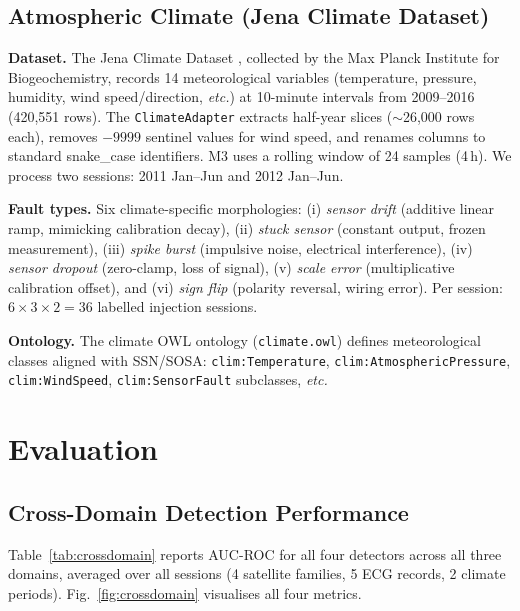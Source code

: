 \documentclass[conference]{IEEEtran}
\begin{document}
\subsection{Atmospheric Climate (Jena Climate Dataset)}

\textbf{Dataset.} The Jena Climate Dataset \cite{jena_climate}, collected by the
Max Planck Institute for Biogeochemistry, records 14 meteorological variables
(temperature, pressure, humidity, wind speed/direction, \emph{etc.}) at 10-minute
intervals from 2009--2016 (420,551 rows). The \texttt{ClimateAdapter} extracts
half-year slices ($\sim$26,000 rows each), removes $-9999$ sentinel values for
wind speed, and renames columns to standard snake\_case identifiers. M3 uses a
rolling window of 24 samples (4\,h). We process two sessions: 2011 Jan--Jun and
2012 Jan--Jun.

\textbf{Fault types.} Six climate-specific morphologies: (i) \emph{sensor drift}
(additive linear ramp, mimicking calibration decay), (ii) \emph{stuck sensor}
(constant output, frozen measurement), (iii) \emph{spike burst} (impulsive noise,
electrical interference), (iv) \emph{sensor dropout} (zero-clamp, loss of signal),
(v) \emph{scale error} (multiplicative calibration offset), and (vi) \emph{sign
flip} (polarity reversal, wiring error). Per session: $6 \times 3 \times 2 = 36$
labelled injection sessions.

\textbf{Ontology.} The climate OWL ontology (\texttt{climate.owl}) defines
meteorological classes aligned with SSN/SOSA: \texttt{clim:Temperature},
\texttt{clim:AtmosphericPressure}, \texttt{clim:WindSpeed}, \texttt{clim:SensorFault}
subclasses, \emph{etc.}

\section{Evaluation}
\label{sec:eval}

\subsection{Cross-Domain Detection Performance}

Table~\ref{tab:crossdomain} reports AUC-ROC for all four detectors across all
three domains, averaged over all sessions (4 satellite families, 5 ECG records,
2 climate periods). Fig.~\ref{fig:crossdomain} visualises all four metrics.
\end{document}
